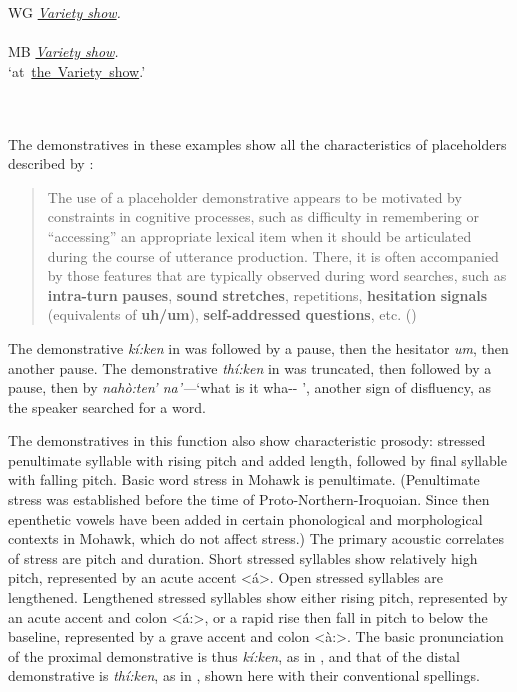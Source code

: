 \documentclass[output=paper]{langscibook}
\begin{document}
\gl \textup{WG}  \textit{\uline{Variety show}.}\\~\\
\gll \textup{MB}   \textit{\uline{Variety show}.}\\
{} {‘at~\uline{the~Variety~show}.’}\\~\\~\\
\z

The demonstratives in these examples show all the characteristics of placeholders described by \citet{HayashiYoon2006}:

\begin{quote}
The use of a placeholder demonstrative appears to be motivated by constraints in cognitive processes, such as difficulty in remembering or “accessing” an appropriate lexical item when it should be articulated during the course of utterance production. There, it is often accompanied by those features that are typically observed during word searches, such as \textbf{intra-turn} \textbf{pauses}, \textbf{sound} \textbf{stretches}, repetitions, \textbf{hesitation} \textbf{signals} (equivalents of \textbf{uh/um}), \textbf{self-addressed} \textbf{questions}, etc. (\citealt[500]{HayashiYoon2006})
\end{quote}

The demonstrative \textit{kí:ken} in  was followed by a pause, then the hesitator \textit{um}, then another pause. The demonstrative \textit{thí:ken} in  was truncated, then followed by a pause, then by \textit{nahò:ten’ na’—}‘what is it wha-{}- ’, another sign of disfluency, as the speaker searched for a word.

The demonstratives in this function also show characteristic prosody: stressed penultimate syllable with rising pitch and added length, followed by final syllable with falling pitch. Basic word stress in Mohawk is penultimate. (Penultimate stress was established before the time of Proto-Northern-Iroquoian. Since then epenthetic vowels have been added in certain phonological and morphological contexts in Mohawk, which do not affect stress.) The primary acoustic correlates of stress are pitch and duration. Short stressed syllables show relatively high pitch, represented by an acute accent <á>. Open stressed syllables are lengthened. Lengthened stressed syllables show either rising pitch, represented by an acute accent and colon <á:>, or a rapid rise then fall in pitch to below the baseline, represented by a grave accent and colon <à:>. The basic pronunciation of the proximal demonstrative is thus \textit{kí:ken}, as in , and that of the distal demonstrative is \textit{thí:ken}, as in , shown here with their conventional spellings.
\end{document}
